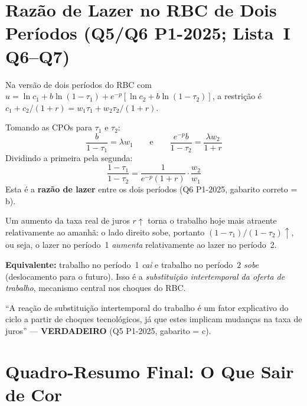 \documentclass[12pt, a4paper]{article}
\begin{document}
\section{Razão de Lazer no RBC de Dois Períodos (Q5/Q6 P1-2025; Lista~I Q6--Q7)}

Na versão de dois períodos do RBC com $u = \ln c_1 + b\ln(1-\tau_1) + e^{-p}[\ln c_2 + b\ln(1-\tau_2)]$, a restrição é $c_1 + c_2/(1+r) = w_1\tau_1 + w_2\tau_2/(1+r)$.

\begin{formulabox}[title={Razão de lazer entre períodos}]
Tomando as CPOs para $\tau_1$ e $\tau_2$:
\[
  \frac{b}{1-\tau_1} = \lambda w_1 \qquad\text{e}\qquad \frac{e^{-p}b}{1-\tau_2} = \frac{\lambda w_2}{1+r}
\]
Dividindo a primeira pela segunda:
\[
  \boxed{\frac{1-\tau_1}{1-\tau_2} = \frac{1}{e^{-p}(1+r)}\cdot\frac{w_2}{w_1}}
\]
Esta é a \textbf{razão de lazer} entre os dois períodos (Q6 P1-2025, gabarito correto = b).
\end{formulabox}

\begin{fatorbox}[title={Substituição intertemporal da oferta de trabalho (Q5)}]
Um aumento da taxa real de juros $r\uparrow$ torna o trabalho hoje mais atraente relativamente ao amanhã: o lado direito sobe, portanto $(1-\tau_1)/(1-\tau_2)\uparrow$, ou seja, o lazer no período~1 \emph{aumenta} relativamente ao lazer no período~2.

\textbf{Equivalente:} trabalho no período~1 \emph{cai} e trabalho no período~2 \emph{sobe} (deslocamento para o futuro). Isso é a \emph{substituição intertemporal da oferta de trabalho}, mecanismo central nos choques do RBC.

``A reação de substituição intertemporal do trabalho é um fator explicativo do ciclo a partir de choques tecnológicos, já que estes implicam mudanças na taxa de juros'' — \textbf{VERDADEIRO} (Q5 P1-2025, gabarito = c).
\end{fatorbox}

\section*{Quadro-Resumo Final: O Que Sair de Cor}
\end{document}
